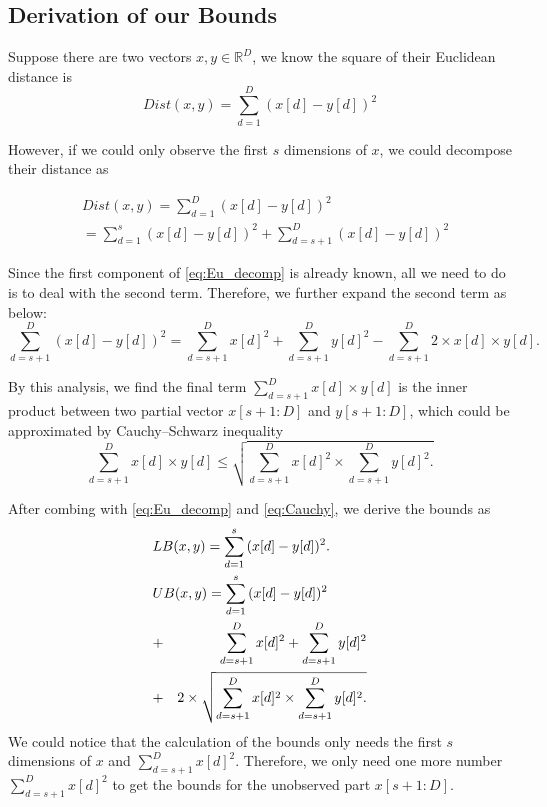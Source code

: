 \subsection{Derivation of our Bounds} %
\label{ss:derivation_of_the_bounds}

Suppose there are two vectors $x,y\in \mathbb{R}^D$, we know the square of their Euclidean distance is 
\begin{equation}
	Dist(x,y)=\sum^D_{d=1}{(x[d]-y[d])^2}
\end{equation}

However, if we could only observe the first $s$ dimensions of $x$, we could decompose their distance as 

\begin{equation}\label{eq:Eu_decomp}
\begin{aligned}
& Dist(x,y)=\sum^D_{d=1}{(x[d]-y[d])^2}  \\
& =\sum^s_{d=1}{(x[d]-y[d])^2} + \sum^D_{d=s+1}{(x[d]-y[d])^2}
\end{aligned}
\end{equation}

Since the first component of \eqref{eq:Eu_decomp} is already known, all we need to do is to deal with the second term. Therefore, we further expand the second term as below:
\[
\sum^D_{d=s+1}{(x[d]-y[d])^2}=\sum^D_{d=s+1}{x[d]^2}+\sum^D_{d=s+1}{y[d]^2}-\sum^D_{d=s+1}{2\times x[d]\times y[d].}
\]

By this analysis, we find the final term $\sum^D_{d=s+1}{x[d]\times y[d]}$ is the inner product between two partial vector $x[s+1:D]$ and $y[s+1:D]$, which could be approximated by Cauchy–Schwarz inequality
\begin{equation}\label{eq:Cauchy}
	\sum^D_{d=s+1}{x[d]\times y[d]} \leq \sqrt{\sum^D_{d=s+1}{x[d]^2}\times \sum^D_{d=s+1}{y[d]^2}.}
\end{equation}

After combing with \eqref{eq:Eu_decomp} and \eqref{eq:Cauchy}, we derive the bounds as 
{
\begin{eqnarray}
\lefteqn{LB(x,y) = \sum^s_{d=1}{(x[d]-y[d])^2}.} \label{eq:single-LB} \\
\lefteqn{UB(x,y) = \sum^s_{d=1}{(x[d]-y[d])^2}} \notag \\
& + & \sum^D_{d=s+1}{x[d]^2}+\sum^D_{d=s+1}{y[d]^2} \notag \\
& + & 2 \times \sqrt{\sum^D_{d=s+1}{x[d]^2}\times \sum^D_{d=s+1}{y[d]^2}.}\label{eq:single-UB}
\end{eqnarray}
}
We could notice that the calculation of the bounds only needs the first $s$ dimensions of $x$ and $\sum^D_{d=s+1}{x[d]^2}$.  Therefore, we only need one more number $\sum^D_{d=s+1}{x[d]^2}$ to get the bounds for the unobserved part $x[s+1:D]$.

